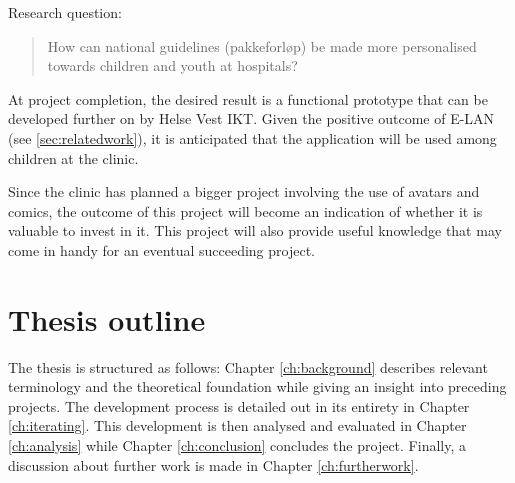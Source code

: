 Research question:

\begin{quote}
    How can national guidelines (pakkeforløp) be made more personalised towards children and youth at hospitals?
\end{quote}

At project completion, the desired result is a functional prototype that can be developed further on by Helse Vest IKT. Given the positive outcome of E-LAN (see \ref{sec:relatedwork}), it is anticipated that the application will be used among children at the clinic.

Since the clinic has planned a bigger project involving the use of avatars and comics, the outcome of this project will become an indication of whether it is valuable to invest in it. This project will also provide useful knowledge that may come in handy for an eventual succeeding project.

\section{Thesis outline}

The thesis is structured as follows: Chapter \ref{ch:background} describes relevant terminology and the theoretical foundation while giving an insight into preceding projects. The development process is detailed out in its entirety in Chapter \ref{ch:iterating}. This development is then analysed and evaluated in Chapter \ref{ch:analysis} while Chapter \ref{ch:conclusion} concludes the project. Finally, a discussion about further work is made in Chapter \ref{ch:furtherwork}.
